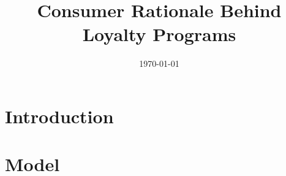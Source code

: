 \documentclass[12pt,a4paper]{article}
\title{Consumer Rationale Behind Loyalty Programs}
\date{\today}
\begin{document}
\maketitle

\section{Introduction}

\section{Model}

\begin{comment}
\section{Future Work}
Can you bring in exploration exploitation somehow? How about the customer doesn't understand the real value of the rewards from the loyalty program and is trying to explore it.


Can you relax the reward function? Consider some irrational reward function? Something on the lines of our previous paper.
\end{comment}


\end{document}
